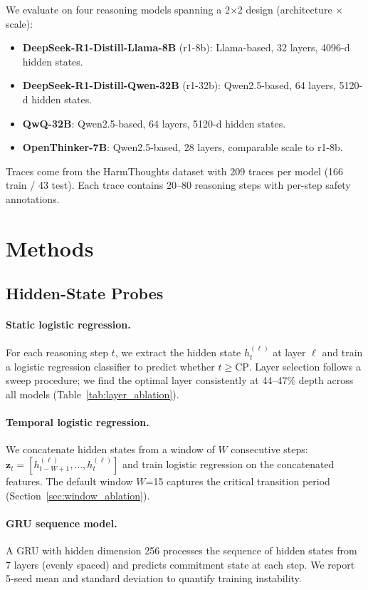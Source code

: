 \documentclass[11pt,a4paper]{article}
\begin{document}
We evaluate on four reasoning models spanning a 2$\times$2 design (architecture $\times$ scale):

\begin{itemize}
\item \textbf{DeepSeek-R1-Distill-Llama-8B} (r1-8b): Llama-based, 32 layers, 4096-d hidden states.
\item \textbf{DeepSeek-R1-Distill-Qwen-32B} (r1-32b): Qwen2.5-based, 64 layers, 5120-d hidden states.
\item \textbf{QwQ-32B}: Qwen2.5-based, 64 layers, 5120-d hidden states.
\item \textbf{OpenThinker-7B}: Qwen2.5-based, 28 layers, comparable scale to r1-8b.
\end{itemize}

Traces come from the HarmThoughts dataset with 209 traces per model (166 train / 43 test). Each trace contains 20--80 reasoning steps with per-step safety annotations.

\section{Methods}

\subsection{Hidden-State Probes}

\paragraph{Static logistic regression.}
For each reasoning step $t$, we extract the hidden state $h_t^{(\ell)}$ at layer $\ell$ and train a logistic regression classifier to predict whether $t \geq \text{CP}$. Layer selection follows a sweep procedure; we find the optimal layer consistently at 44--47\% depth across all models (Table~\ref{tab:layer_ablation}).

\paragraph{Temporal logistic regression.}
We concatenate hidden states from a window of $W$ consecutive steps: $\mathbf{z}_t = [h_{t-W+1}^{(\ell)}, \ldots, h_t^{(\ell)}]$ and train logistic regression on the concatenated features. The default window $W$=15 captures the critical transition period (Section~\ref{sec:window_ablation}).

\paragraph{GRU sequence model.}
A GRU with hidden dimension 256 processes the sequence of hidden states from 7 layers (evenly spaced) and predicts commitment state at each step. We report 5-seed mean and standard deviation to quantify training instability.
\end{document}
